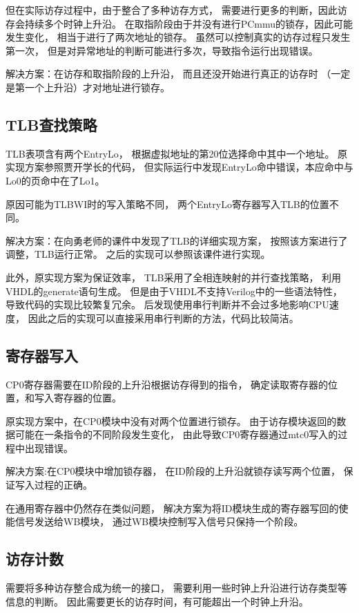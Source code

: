         但在实际访存过程中，由于整合了多种访存方式，
        需要进行更多的判断，因此访存会持续多个时钟上升沿。
        在取指阶段由于并没有进行PCmmu的锁存，因此可能发生变化，
        相当于进行了两次地址的锁存。
        虽然可以控制真实的访存过程只发生第一次，
        但是对异常地址的判断可能进行多次，导致指令运行出现错误。

        解决方案：在访存和取指阶段的上升沿，
        而且还没开始进行真正的访存时
        （一定是第一个上升沿）才对地址进行锁存。

    \subsection{TLB查找策略}
        TLB表项含有两个EntryLo，
        根据虚拟地址的第20位选择命中其中一个地址。
        原实现方案参照贾开学长的代码，
        但实际运行中发现EntryLo命中错误，本应命中与Lo0的页命中在了Lo1。

        原因可能为TLBWI时的写入策略不同，
        两个EntryLo寄存器写入TLB的位置不同。

        解决方案：在向勇老师的课件中发现了TLB的详细实现方案，
        按照该方案进行了调整，TLB运行正常。
        之后的实现可以参照该课件进行实现。

        此外，原实现方案为保证效率，
        TLB采用了全相连映射的并行查找策略，
        利用VHDL的generate语句生成。
        但是由于VHDL不支持Verilog中的一些语法特性，
        导致代码的实现比较繁复冗余。
        后发现使用串行判断并不会过多地影响CPU速度，
        因此之后的实现可以直接采用串行判断的方法，代码比较简洁。

    \subsection{寄存器写入}
        CP0寄存器需要在ID阶段的上升沿根据访存得到的指令，
        确定读取寄存器的位置，和写入寄存器的位置。

        原实现方案中，在CP0模块中没有对两个位置进行锁存。
        由于访存模块返回的数据可能在一条指令的不同阶段发生变化，
        由此导致CP0寄存器通过mtc0写入的过程中出现错误。

        解决方案:在CP0模块中增加锁存器，
        在ID阶段的上升沿就锁存读写两个位置，
        保证写入过程的正确。

        在通用寄存器中仍然存在类似问题，
        解决方案为将ID模块生成的寄存器写回的使能信号发送给WB模块，
        通过WB模块控制写入信号只保持一个阶段。

    \subsection{访存计数}
        需要将多种访存整合成为统一的接口，
        需要利用一些时钟上升沿进行访存类型等信息的判断。
        因此需要更长的访存时间，有可能超出一个时钟上升沿。

